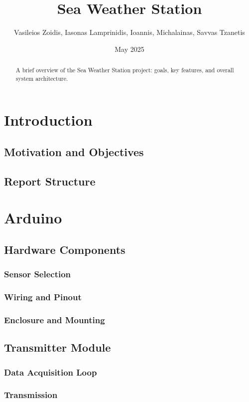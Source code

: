 \documentclass{article}
\title{Sea Weather Station}
\author{Vasileios Zoidis, Iasonas Lamprinidis, Ioannis, Michalainas, Savvas Tzanetis}
\date{May 2025}
\begin{document}
\maketitle

\begin{abstract}
  A brief overview of the Sea Weather Station project: goals, key features, and overall system architecture.
\end{abstract}

\tableofcontents
\clearpage

\section{Introduction}
\subsection{Motivation and Objectives}
\subsection{Report Structure}

\section{Arduino}
\subsection{Hardware Components}
    \subsubsection{Sensor Selection}
    \subsubsection{Wiring and Pinout}
    \subsubsection{Enclosure and Mounting}
\subsection{Transmitter Module}
    \subsubsection{Data Acquisition Loop}
    \subsubsection{Transmission}
\end{document}
